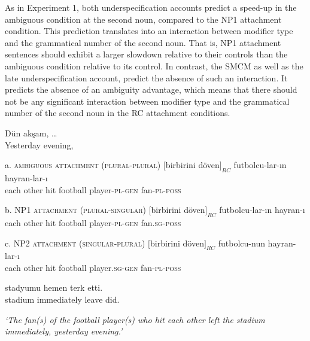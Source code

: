 \documentclass[english, doc]{apa7}\usepackage[]{graphicx}\usepackage[]{color}
\begin{document}
As in Experiment 1, both underspecification accounts predict a speed-up in the ambiguous condition at the second noun, compared to the NP1 attachment condition. This prediction translates into an interaction between modifier type and the grammatical number of the second noun. That is, NP1 attachment sentences should exhibit a larger slowdown relative to their controls than the ambiguous condition relative to its control. In contrast, the SMCM as well as the late underspecification account, predict the absence of such an interaction. It predicts the absence of an ambiguity advantage, which means that there should not be any significant interaction between modifier type and the grammatical number of the second noun in the RC attachment conditions.

\begin{exe}
\ex \label{ExpSPRExperimental} 

\gll Dün akşam, \ldots \\
     Yesterday evening, {} \\
     
\begin{xlist} 

\item[a.]{}\textsc{ambiguous attachment (plural-plural)}{} 
\gll $[$birbirini döven$]_{RC}$ futbolcu-lar-ın hayran-lar-ı \\
{each other} hit {football player}-\textsc{pl}-\textsc{gen} {fan}-\textsc{pl}-\textsc{poss}  \\

\item[b.]{}\textsc{NP1 attachment (plural-singular)}{} 
\gll $[$birbirini döven$]_{RC}$ futbolcu-lar-ın hayran-ı \\
{each other} hit  {football player}-\textsc{pl}-\textsc{gen} {fan}.\textsc{sg}-\textsc{poss}  \\

\item[c.]{}\textsc{NP2 attachment (singular-plural)}{} 
\gll $[$birbirini döven$]_{RC}$ futbolcu-nun hayran-lar-ı\\
{each other} hit  {football player}.\textsc{sg}-\textsc{gen} {fan}-\textsc{pl}-\textsc{poss}  \\

\item[] \gll {\ldots} stadyumu hemen terk etti. \\
{}       stadium  immediately leave did. \\
\end{xlist}

\textit{`The fan(s) of the football player(s) who hit each other left the stadium immediately, yesterday evening.'}
\end{exe}
\end{document}

